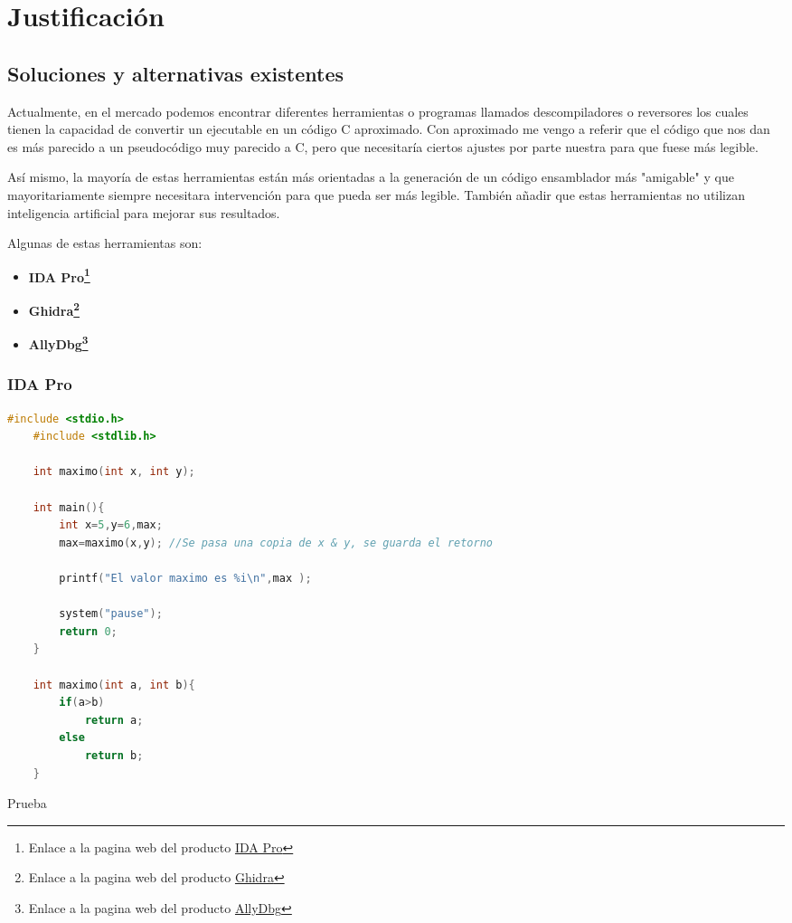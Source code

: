 \chapter{Justificación}
\label{cap:justificacion}

\section{Soluciones y alternativas existentes}
\label{sec:alternativas}

Actualmente, en el mercado podemos encontrar diferentes herramientas o programas llamados descompiladores o reversores los cuales tienen la capacidad de convertir un ejecutable
en un código C aproximado. Con aproximado me vengo a referir que el código que nos dan es más parecido a un pseudocódigo muy parecido a C, pero que necesitaría ciertos ajustes
por parte nuestra para que fuese más legible.

Así mismo, la mayoría de estas herramientas están más orientadas a la generación de un código ensamblador más "amigable" y que mayoritariamente siempre necesitara intervención
para que pueda ser más legible. También añadir que estas herramientas no utilizan inteligencia artificial para mejorar sus resultados.

Algunas de estas herramientas son:

\begin{itemize}
    \item \bf IDA Pro\footnote{Enlace a la pagina web del producto \href{https://hex-rays.com/ida-pro/}{IDA Pro}}
    \item \bf Ghidra\footnote{Enlace a la pagina web del producto \href{https://ghidra-sre.org/}{Ghidra}}
    \item \bf AllyDbg\footnote{Enlace a la pagina web del producto \href{https://www.ollydbg.de/}{AllyDbg}}
\end{itemize}

\subsection{IDA Pro}
\label{subsec:IDA_pro}

\begin{code}[h]
    \begin{lstlisting}[language=C++]
    #include <stdio.h>
    #include <stdlib.h>

    int maximo(int x, int y);

    int main(){
        int x=5,y=6,max;
        max=maximo(x,y); //Se pasa una copia de x & y, se guarda el retorno

        printf("El valor maximo es %i\n",max );

        system("pause");
        return 0;
    }

    int maximo(int a, int b){
        if(a>b)
            return a;
        else
            return b;
    }
    \end{lstlisting}
    \caption[Prueba 2]{Prueba}
    \label{cod:codejemplo}
\end{code}
    

